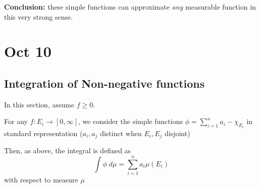\documentclass[12pt]{report}
\newcommand{\X}{\chi}
\begin{document}
    \textbf{Conclusion:} these simple functions can approximate \emph{any} measurable function in this very strong sense. 

\section*{Oct 10}
\subsection*{Integration of Non-negative functions} 
    In this section, assume $f \geq 0$. 

    For any $f: E_i \to [0, \infty]$, we consider the simple functions $\phi = \sum_{i=1}^{n} a_i - \X_{E_i}$ in standard representation ($a_i, a_j$ distinct when $E_i, E_j$ disjoint) 

    Then, as above, the integral is defined as
    \[\int \phi \; d\mu = \sum_{i=1}^{n} a_i \mu(E_i)\]
    with respect to measure $\mu$
\end{document}
